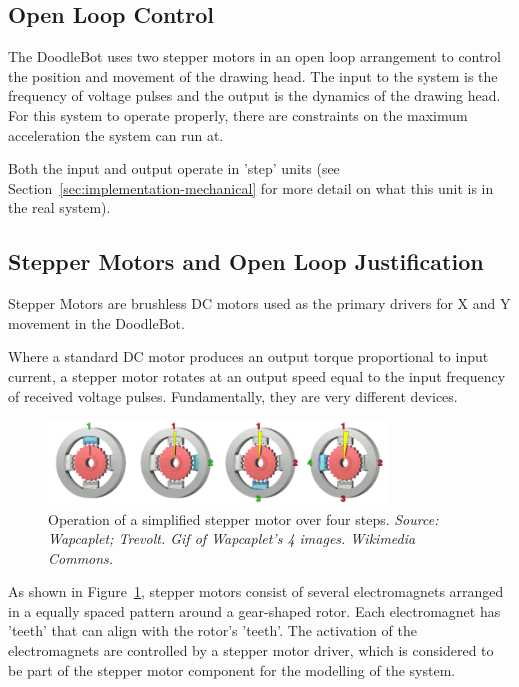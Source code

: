 \subsection{Open Loop Control}
	The DoodleBot uses two stepper motors in an open loop arrangement to control the position and movement of the drawing head. The input to the system is the frequency of voltage pulses and the output is the dynamics of the drawing head. For this system to operate properly, there are constraints on the maximum acceleration the system can run at.
	
	Both the input and output operate in 'step' units (see Section~\ref*{sec:implementation-mechanical} for more detail on what this unit is in the real system).
	
\subsection{Stepper Motors and Open Loop Justification}
		\label{sec:control-stepper}
			
		Stepper Motors are brushless DC motors used as the primary drivers for X and Y movement in the DoodleBot. 
		
		Where a standard DC motor produces an output torque proportional to input current, a stepper motor rotates at an output speed equal to the input frequency of received voltage pulses. Fundamentally, they are very different devices.
		
		\begin{figure}[h]
			\centering
			\includegraphics[width=0.8\textwidth]{figures/optimisation/steppermotor}
			\caption[Operation of a simple stepper motor]{Operation of a simplified stepper motor over four steps. \textit{Source: Wapcaplet; Trevolt. Gif of Wapcaplet's 
			4 images. Wikimedia Commons.\cite{website:stepper}}}
			\label{fig:stepper}
		\end{figure}
		
		As shown in Figure~\ref{fig:stepper}, stepper motors consist of several electromagnets arranged in a equally spaced pattern around a gear-shaped rotor. Each electromagnet has 'teeth' that can align with the rotor's 'teeth'. The activation of the electromagnets are controlled by a stepper motor driver, which is considered to be part of the stepper motor component for the modelling of the system.
		
